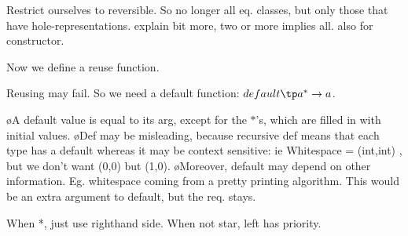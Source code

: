 %
%
%
%
%
%


Restrict ourselves to reversible. So no longer all eq. classes, but only those that have hole-representations. explain bit more, two or more implies all. also for constructor.


Now we define a reuse function.

Reusing may fail. So we need a default function: $default \tp a^* \rightarrow a$.


\bl
\o A default value is equal to its arg, except for the $*$'s, which are filled in with initial values.
\o Def may be misleading, because recursive def means that each type has a default whereas it may be context sensitive: ie Whitespace = (int,int) , but we don't want (0,0) but (1,0).
\o Moreover, default may depend on other information. Eg. whitespace coming from a pretty printing algorithm. This would be an extra argument to default, but the req. stays.
\el

When *, just use righthand side. When not star, left has priority. 

